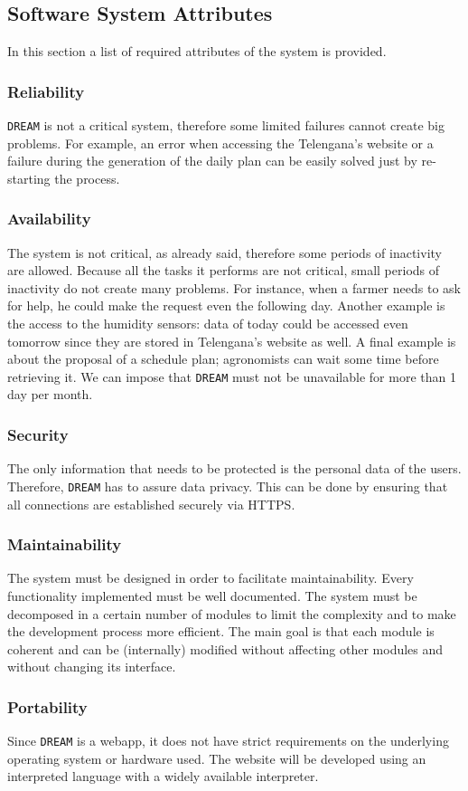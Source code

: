 \documentclass{article}
\begin{document}
\subsection{Software System Attributes}
In this section a list of required attributes of the system is provided.
\subsubsection{Reliability}
\verb|DREAM| is not a critical system, therefore some limited failures cannot create big problems. For example, an error when accessing the Telengana’s website or a failure during the generation of the daily plan can be easily solved just by re-starting the process.
\subsubsection{Availability}
The system is not critical, as already said, therefore some periods of inactivity are allowed. Because all the tasks it performs are not critical, small periods of inactivity do not create many problems. For instance, when a farmer needs to ask for help, he could make the request even the following day. Another example is the access to the humidity sensors: data of today could be accessed even tomorrow since they are stored in Telengana’s website as well. A final example is about the proposal of a schedule plan; agronomists can wait some time before retrieving it. 
We can impose that \verb|DREAM| must not be unavailable for more than 1 day per month.
\subsubsection{Security}
The only information that needs to be protected is the personal data of the users. Therefore, \verb|DREAM| has to assure data privacy. This can be done by ensuring that all connections are established securely via HTTPS.
\subsubsection{Maintainability}
The system must be designed in order to facilitate maintainability. Every functionality implemented must be well documented. The system must be decomposed in a certain number of modules to limit the complexity and to make the development process more efficient. The main goal is that each module is coherent and can be (internally) modified without affecting other modules and without changing its interface.
\subsubsection{Portability}
Since \verb|DREAM| is a webapp, it does not have strict requirements on the underlying operating system or hardware used. The website will be developed using an interpreted language with a widely available interpreter.
\end{document}
